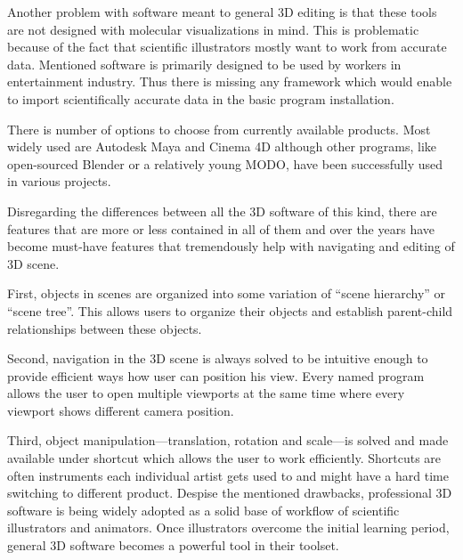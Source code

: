\documentclass[
  digital, %
  table,   %
  nolof,     %
  nolot,     %
]{fithesis3}
\begin{document}
Another problem with software meant to general 3D editing is that these tools are not designed with molecular visualizations in mind. This is problematic because of the fact that scientific illustrators mostly want to work from accurate data. Mentioned software is primarily designed to be used by workers in entertainment industry. Thus there is missing any framework which would enable to import scientifically accurate data in the basic program installation.

There is number of options to choose from currently available products. Most widely used are Autodesk Maya and Cinema 4D although other programs, like open-sourced Blender or a relatively young MODO\cite{MODOscientificIll}, have been successfully used in various projects.


Disregarding the differences between all the 3D software of this kind, there are features that are more or less contained in all of them and over the years have become must-have features that tremendously help with navigating and editing of 3D scene.

First, objects in scenes are organized into some variation of ``scene hierarchy'' or ``scene tree''. This allows users to organize their objects and establish parent-child relationships between these objects.

Second, navigation in the 3D scene is always solved to be intuitive enough to provide efficient ways how user can position his view. Every named program allows the user to open multiple viewports at the same time where every viewport shows different camera position.

Third, object manipulation—translation, rotation and scale—is solved and made available under shortcut which allows the user to work efficiently. Shortcuts are often instruments each individual artist gets used to and might have a hard time switching to different product.
Despise the mentioned drawbacks, professional 3D software is being widely adopted as a solid base of workflow of scientific illustrators and animators. Once illustrators overcome the initial learning period, general 3D software becomes a powerful tool in their toolset. 
\end{document}
